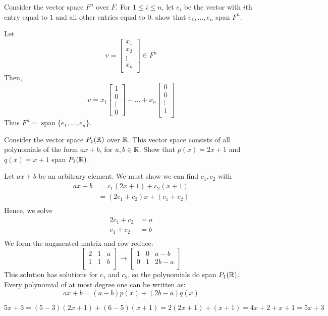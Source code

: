\documentclass{article}
\DeclareMathOperator{\spn}{span}
\begin{document}
\begin{example}
  Consider the vector space $F^n$ over $F$. For $1 \leq i \leq n$, let $e_i$ be the vector with $i$th entry equal to $1$ and all other entries equal to $0$. show that $e_1, \ldots, e_n$ span $F^n$.

  Let \[
    v =
    \begin{bmatrix}
      x_1\\x_2\\\vdots\\x_n\\
    \end{bmatrix} \in F^n
  \]
  Then, \[
    v = x_1
    \begin{bmatrix}
      1\\0\\\vdots\\0
    \end{bmatrix} + \dots + x_n
    \begin{bmatrix}
      0\\ 0\\ \vdots \\ 1\\
    \end{bmatrix}
  \]
  Thus $F^n = \spn \{e_1, \ldots, e_n\}$.
\end{example}
\begin{example}
  Consider the vector space $P_1(\mathbb{R})$ over $\mathbb{R}$. This vector space consists of all polynomials of the form $ax + b$, for $a, b \in \mathbb{R}$. Show that $p(x) = 2x+1$ and $q(x) = x+ 1$ span $P_1(\mathbb{R})$.

  Let $ax + b$ be an arbitrary element. We must show we can find $c_1, c_2$ with
  \begin{align*}
    ax + b &= c_1(2x+1) + c_2(x+1)\\
    &= (2c_1 + c_2)x + (c_1 + c_2)\\
  \end{align*}
  Hence, we solve
  \begin{align*}
    2c_1 + c_2 &= a\\
    c_1 + c_2 &= b\\
  \end{align*}
  We form the augmented matrix and row reduce:
  \[
    \begin{bmatrix}
      2 & 1 & a\\
      1 & 1 & b\\
    \end{bmatrix}
    \to
    \begin{bmatrix}
      1 & 0 & a - b\\
      0 & 1 & 2b - a\\
    \end{bmatrix}
  \]
  This solution has solutions for $c_1$ and $c_2$, so the polynomials do span $P_1(\mathbb{R})$.
  Every polynomial of at most degree one can be written as:
  \[
    ax + b = (a-b)p(x) + (2b - a)q(x)
  \]

  \[
    5x+ 3 = (5-3)(2x+1) + (6 - 5)(x+1) = 2(2x+1) + (x + 1) = 4x+ 2 + x + 1 = 5x + 3
  \]
\end{example}
\end{document}
